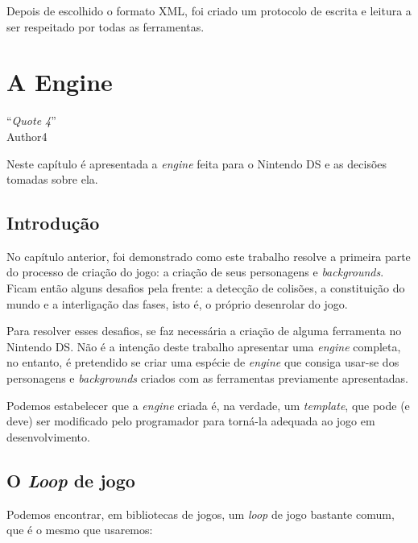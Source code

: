 \documentclass[brazil]{abnt}
\begin{document}
Depois de escolhido o formato XML, foi criado um protocolo de escrita e leitura a ser respeitado por todas as ferramentas.



\chapter{A Engine}

\vfill{}
\begin{flushright}{}``\emph{Quote 4}''\\
{\small Author4}\end{flushright}{\small \par}
\vfill{}

Neste capítulo é apresentada a \textit{engine} feita para o Nintendo DS e as decisões tomadas sobre ela.
\newpage

\section{Introdução}

No capítulo anterior, foi demonstrado como este trabalho resolve a primeira parte do processo de criação do jogo: a criação de seus personagens e \textit{backgrounds}. Ficam então alguns desafios pela frente: a detecção de colisões, a constituição do mundo e a interligação das fases, isto é, o próprio desenrolar do jogo.

Para resolver esses desafios, se faz necessária a criação de alguma ferramenta no Nintendo DS. Não é a intenção deste trabalho apresentar uma \textit{engine} completa, no entanto, é pretendido se criar uma espécie de \textit{engine} que consiga usar-se dos personagens e \textit{backgrounds} criados com as ferramentas previamente apresentadas.

Podemos estabelecer que a \textit{engine} criada é, na verdade, um \textit{template}, que pode (e deve) ser modificado pelo programador para torná-la adequada ao jogo em desenvolvimento.

\section{O \textit{Loop} de jogo}

Podemos encontrar, em bibliotecas de jogos, um \textit{loop} de jogo bastante comum, que é o mesmo que usaremos:


\end{document}
